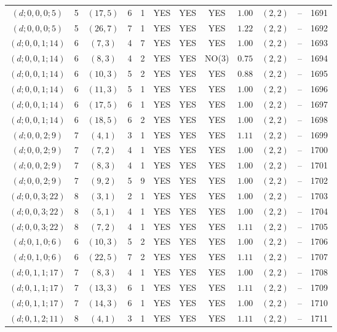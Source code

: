 \begin{longtable}{|c|c|c|c|c|c|c|c|c|c|c|c|}
$(d;0,0,0;5)$ & 5 & $(17,5)$ & 6 & 1 & YES & YES & YES & $1.00$ & $(2,2)$ & -- & 1691\\
$(d;0,0,0;5)$ & 5 & $(26,7)$ & 7 & 1 & YES & YES & YES & $1.22$ & $(2,2)$ & -- & 1692\\
$(d;0,0,1;14)$ & 6 & $(7,3)$ & 4 & 7 & YES & YES & YES & $1.00$ & $(2,2)$ & -- & 1693\\
$(d;0,0,1;14)$ & 6 & $(8,3)$ & 4 & 2 & YES & YES & NO(3) & $0.75$ & $(2,2)$ & -- & 1694\\
$(d;0,0,1;14)$ & 6 & $(10,3)$ & 5 & 2 & YES & YES & YES & $0.88$ & $(2,2)$ & -- & 1695\\
$(d;0,0,1;14)$ & 6 & $(11,3)$ & 5 & 1 & YES & YES & YES & $1.00$ & $(2,2)$ & -- & 1696\\
$(d;0,0,1;14)$ & 6 & $(17,5)$ & 6 & 1 & YES & YES & YES & $1.00$ & $(2,2)$ & -- & 1697\\
$(d;0,0,1;14)$ & 6 & $(18,5)$ & 6 & 2 & YES & YES & YES & $1.00$ & $(2,2)$ & -- & 1698\\
$(d;0,0,2;9)$ & 7 & $(4,1)$ & 3 & 1 & YES & YES & YES & $1.11$ & $(2,2)$ & -- & 1699\\
$(d;0,0,2;9)$ & 7 & $(7,2)$ & 4 & 1 & YES & YES & YES & $1.00$ & $(2,2)$ & -- & 1700\\
$(d;0,0,2;9)$ & 7 & $(8,3)$ & 4 & 1 & YES & YES & YES & $1.00$ & $(2,2)$ & -- & 1701\\
$(d;0,0,2;9)$ & 7 & $(9,2)$ & 5 & 9 & YES & YES & YES & $1.00$ & $(2,2)$ & -- & 1702\\
$(d;0,0,3;22)$ & 8 & $(3,1)$ & 2 & 1 & YES & YES & YES & $1.00$ & $(2,2)$ & -- & 1703\\
$(d;0,0,3;22)$ & 8 & $(5,1)$ & 4 & 1 & YES & YES & YES & $1.00$ & $(2,2)$ & -- & 1704\\
$(d;0,0,3;22)$ & 8 & $(7,2)$ & 4 & 1 & YES & YES & YES & $1.11$ & $(2,2)$ & -- & 1705\\
$(d;0,1,0;6)$ & 6 & $(10,3)$ & 5 & 2 & YES & YES & YES & $1.00$ & $(2,2)$ & -- & 1706\\
$(d;0,1,0;6)$ & 6 & $(22,5)$ & 7 & 2 & YES & YES & YES & $1.11$ & $(2,2)$ & -- & 1707\\
$(d;0,1,1;17)$ & 7 & $(8,3)$ & 4 & 1 & YES & YES & YES & $1.00$ & $(2,2)$ & -- & 1708\\
$(d;0,1,1;17)$ & 7 & $(13,3)$ & 6 & 1 & YES & YES & YES & $1.11$ & $(2,2)$ & -- & 1709\\
$(d;0,1,1;17)$ & 7 & $(14,3)$ & 6 & 1 & YES & YES & YES & $1.00$ & $(2,2)$ & -- & 1710\\
$(d;0,1,2;11)$ & 8 & $(4,1)$ & 3 & 1 & YES & YES & YES & $1.11$ & $(2,2)$ & -- & 1711\\

\end{longtable}
